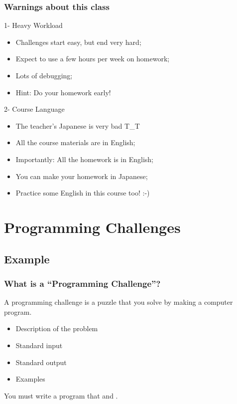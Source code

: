 \documentclass{beamer}
\begin{document}
\begin{frame}
  \frametitle{Warnings about this class}
  \begin{alertblock}{1- Heavy Workload}
    \begin{itemize}
    \item Challenges start easy, but end very hard;
    \item Expect to use a few hours per week on homework;
    \item Lots of debugging;

      \bigskip

    \item Hint: Do your homework early!
    \end{itemize}
  \end{alertblock}

  \begin{alertblock}{2- Course Language}
    \begin{itemize}
    \item The teacher's Japanese is very bad T\_T
    \item All the course materials are in English;
    \item Importantly: All the homework is in English;
    \item You can make your homework in Japanese;

      \bigskip

    \item Practice some English in this course too! :-)
    \end{itemize}
  \end{alertblock}

\end{frame}

\section{Programming Challenges}
\subsection{Example}

\begin{frame}
  \frametitle{What is a ``Programming Challenge''?}

  A programming challenge is a puzzle that you solve by making a
  computer program.

  \bigskip

  \begin{itemize}
  \item Description of the problem
  \item Standard input
  \item Standard output
  \item Examples
  \end{itemize}
  
  \bigskip

  You must write a program that  and
  .
  
\end{frame}
\end{document}
